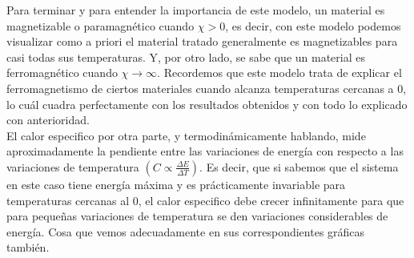 \documentclass[12pt,paper]{article}
\begin{document}
Para terminar y para entender la importancia de este modelo, un material es magnetizable o paramagnético cuando $\chi>0$, es decir, con este modelo podemos visualizar como a priori el material tratado generalmente es magnetizables para casi todas sus temperaturas. Y, por otro lado, se sabe que un material es ferromagnético cuando $\chi \rightarrow \infty$. Recordemos que este modelo trata de explicar el ferromagnetismo de ciertos materiales cuando alcanza temperaturas cercanas a 0, lo cuál cuadra perfectamente con los resultados obtenidos y con todo lo explicado con anterioridad.\\
El calor especifico por otra parte, y termodinámicamente hablando, mide aproximadamente la pendiente entre las variaciones de energía con respecto a las variaciones de temperatura $(C \propto \frac{\Delta E}{\Delta T})$. Es decir, que si sabemos que el sistema en este caso tiene energía máxima y es prácticamente invariable para temperaturas cercanas al 0, el calor especifico debe crecer infinitamente para que para pequeñas variaciones de temperatura se den variaciones considerables de energía. Cosa que vemos adecuadamente en sus correspondientes gráficas también.\\
\end{document}
